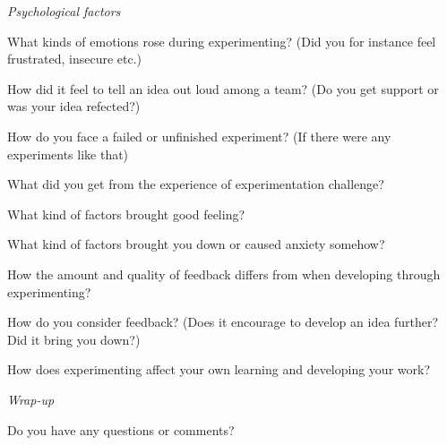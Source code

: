 \noindent\emph{Psychological factors}
\vspace{-3mm} 
\begin{list}{*}{}
\setlength{\itemsep}{-3pt}
\item What kinds of emotions rose during experimenting? (Did you for instance feel frustrated, insecure etc.)
\item How did it feel to tell an idea out loud among a team? (Do you get support or was your idea refected?)
\item How do you face a failed or unfinished experiment? (If there were any experiments like that)
\item What did you get from the experience of experimentation challenge?
\item What kind of factors brought good feeling? 
\item What kind of factors brought you down or caused anxiety somehow? 

\item How the amount and quality of feedback differs from when developing through experimenting?
\item How do you consider feedback? (Does it encourage to develop an idea further? Did it bring you down?)
\item  How does experimenting affect your own learning and developing your work? 
\end{list}

\noindent\emph{Wrap-up} 
\vspace{-3mm} 
\begin{list}{*}{}
\setlength{\itemsep}{-3pt}
\item Do you have any questions or comments?
\end{list}
\clearpage



\label{appendices-end}